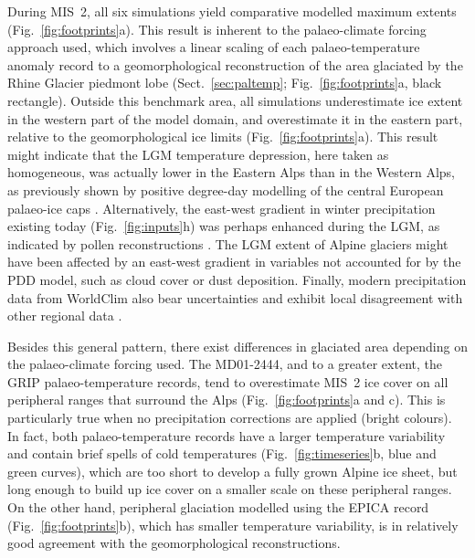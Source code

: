 \documentclass[tc, manuscript]{copernicus}
\begin{document}
    During MIS~2, all six simulations yield comparative modelled maximum
    extents (Fig.~\ref{fig:footprints}a). This result is inherent to the
    palaeo-climate forcing approach used, which involves a linear scaling of
    each palaeo-temperature anomaly record to a geomorphological
    reconstruction of the area glaciated by the Rhine Glacier piedmont lobe
    (Sect.~\ref{sec:paltemp}; Fig.~\ref{fig:footprints}a, black rectangle).
    Outside this benchmark area, all simulations underestimate ice extent in
    the western part of the model domain, and overestimate it in the eastern
    part, relative to the geomorphological ice limits
    (Fig.~\ref{fig:footprints}a). This result might indicate that the LGM
    temperature depression, here taken as homogeneous, was actually lower in
    the Eastern Alps than in the Western Alps, as previously shown by positive
    degree-day modelling of the central European palaeo-ice caps
    \citep{Heyman.etal.2013}. Alternatively, the east-west gradient in winter
    precipitation existing today (Fig.~\ref{fig:inputs}h) was
    perhaps enhanced during the LGM, as indicated by pollen reconstructions
    \citep{Wu.etal.2007}. The LGM extent of Alpine glaciers might have
    been affected by an east-west gradient in variables not accounted for
    by the PDD model, such as cloud cover or dust deposition. Finally, modern
    precipitation data from WorldClim also bear uncertainties and exhibit local
    disagreement with other regional data \citep{Isotta.etal.2013}.

    Besides this general pattern, there exist differences in glaciated area
    depending on the palaeo-climate forcing used. The MD01-2444, and to a
    greater extent, the GRIP palaeo-temperature records, tend to overestimate
    MIS~2 ice cover on all peripheral ranges that surround the Alps
    (Fig.~\ref{fig:footprints}a and c). This is particularly true when no
    precipitation corrections are applied (bright colours). In fact, both
    palaeo-temperature records have a larger temperature variability and
    contain brief spells of cold temperatures (Fig.~\ref{fig:timeseries}b,
    blue and green curves), which are too short to develop a
    fully grown Alpine ice sheet, but long enough to build up ice cover on a
    smaller scale on these peripheral ranges. On
    the other hand, peripheral glaciation modelled using the EPICA record
    (Fig.~\ref{fig:footprints}b), which has smaller temperature variability,
    is in relatively good agreement with the geomorphological reconstructions.
\end{document}
